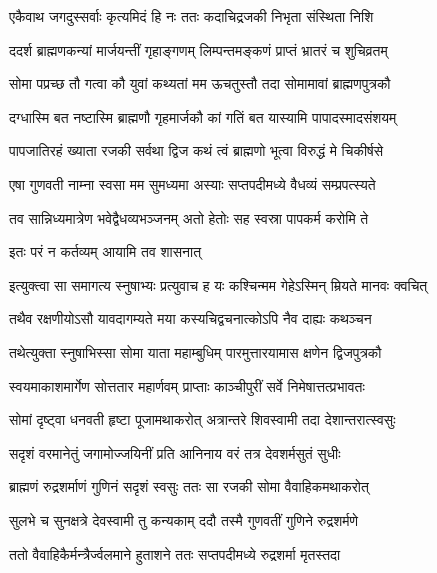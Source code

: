 \twolineshloka
{एकैवाथ जगदुस्सर्वाः कृत्यमिदं हि नः}
{ततः कदाचिद्रजकी निभृता संस्थिता निशि} %

\twolineshloka
{ददर्श ब्राह्मणकन्यां मार्जयन्तीं गृहाङ्गणम्}
{लिम्पन्तमङ्कणं प्राप्तं भ्रातरं च शुचिव्रतम्} %

\twolineshloka
{सोमा पप्रच्छ तौ गत्वा कौ युवां कथ्यतां मम}
{ऊचतुस्तौ तदा सोमामावां ब्राह्मणपुत्रकौ} %


\twolineshloka
{दग्धास्मि बत नष्टास्मि ब्राह्मणौ गृहमार्जकौ}
{कां गतिं बत यास्यामि पापादस्मादसंशयम्} %

\twolineshloka
{पापजातिरहं ख्याता रजकी सर्वथा द्विज}
{कथं त्वं ब्राह्मणो भूत्वा विरुद्धं मे चिकीर्षसे} %


\twolineshloka
{एषा गुणवती नाम्ना स्वसा मम सुमध्यमा}
{अस्याः सप्तपदीमध्ये वैधव्यं सम्प्रपत्स्यते} %

\twolineshloka
{तव सान्निध्यमात्रेण भवेद्वैधव्यभञ्जनम्}
{अतो हेतोः सह स्वस्रा पापकर्म करोमि ते} %


\onelineshloka
{इतः परं न कर्तव्यम् आयामि तव शासनात्} %

\twolineshloka
{इत्युक्त्वा सा समागत्य स्नुषाभ्यः प्रत्युवाच ह}
{यः कश्चिन्मम गेहेऽस्मिन् म्रियते मानवः क्वचित्} %

\twolineshloka
{तथैव रक्षणीयोऽसौ यावदागम्यते मया}
{कस्यचिद्वचनात्कोऽपि नैव दाह्यः कथञ्चन} %

\twolineshloka
{तथेत्युक्ता स्नुषाभिस्सा सोमा याता महाम्बुधिम्}
{पारमुत्तारयामास क्षणेन द्विजपुत्रकौ} %

\twolineshloka
{स्वयमाकाशमार्गेण सोत्ततार महार्णवम्}
{प्राप्ताः काञ्चीपुरीं सर्वे निमेषात्तत्प्रभावतः} %

\twolineshloka
{सोमां दृष्ट्वा धनवती हृष्टा पूजामथाकरोत्}
{अत्रान्तरे शिवस्वामी तदा देशान्तरात्स्वसुः} %

\twolineshloka
{सदृशं वरमानेतुं जगामोज्जयिनीं प्रति}
{आनिनाय वरं तत्र देवशर्मसुतं सुधीः} %

\twolineshloka
{ब्राह्मणं रुद्रशर्माणं गुणिनं सदृशं स्वसुः}
{ततः सा रजकी सोमा वैवाहिकमथाकरोत्} %

\twolineshloka
{सुलभे च सुनक्षत्रे देवस्वामी तु कन्यकाम्}
{ददौ तस्मै गुणवतीं गुणिने रुद्रशर्मणे} %

\twolineshloka
{ततो वैवाहिकैर्मन्त्रैर्ज्वलमाने हुताशने}
{ततः सप्तपदीमध्ये रुद्रशर्मा मृतस्तदा} %

